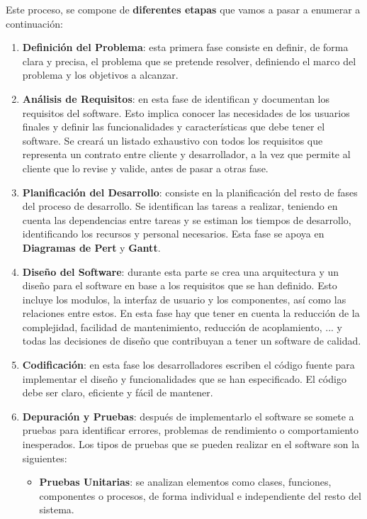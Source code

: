 Este proceso, se compone de \textbf{diferentes etapas} que vamos a pasar a enumerar a continuación:

\begin{enumerate}
	\item \textbf{Definición del Problema}: esta primera fase consiste en definir, de forma clara y precisa, el problema que se pretende resolver, definiendo el marco del problema y los objetivos a alcanzar.
	\item \textbf{Análisis de Requisitos}: en esta fase de identifican y documentan los requisitos del software. Esto implica conocer las necesidades de los usuarios finales y definir las funcionalidades y características que debe tener el software. Se creará un listado exhaustivo con todos los requisitos que representa un contrato entre cliente y desarrollador, a la vez que permite al cliente que lo revise y valide, antes de pasar a otras fase.
	\item \textbf{Planificación del Desarrollo}: consiste en la planificación del resto de fases del proceso de desarrollo. Se identifican las tareas a realizar, teniendo en cuenta las dependencias entre tareas y se estiman los tiempos de desarrollo, identificando los recursos y personal necesarios. Esta fase se apoya en \textbf{Diagramas de Pert} y \textbf{Gantt}.
	\item \textbf{Diseño del Software}: durante esta parte se crea una arquitectura y un diseño para el software en base a los requisitos que se han definido. Esto incluye los modulos, la interfaz de usuario y los componentes, así como las relaciones entre estos. En esta fase hay que tener en cuenta la reducción de la complejidad, facilidad de mantenimiento, reducción de acoplamiento, ... y todas las decisiones de diseño que contribuyan a tener un software de calidad.
	\item \textbf{Codificación}: en esta fase los desarrolladores escriben el código fuente para implementar el diseño y funcionalidades que se han especificado. El código debe ser claro, eficiente y fácil de mantener. 
	\item \textbf{Depuración y Pruebas}: después de implementarlo el software se somete a pruebas para identificar errores, problemas de rendimiento o comportamiento inesperados. Los tipos de pruebas que se pueden realizar en el software son la siguientes:
	\begin{itemize}
		\item \textbf{Pruebas Unitarias}: se analizan elementos como clases, funciones, componentes o procesos, de forma individual e independiente del resto del sistema.

\end{itemize}
\end{enumerate}
